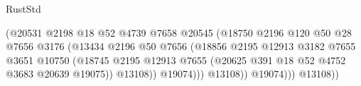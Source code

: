 \begin{lexlean}{RustStd}
\begin{coremodule}
                                                  (@20531
                                                    @2198
                                                    @18
                                                    @52
                                                    @4739
                                                    @7658
                                                    @20545
                                                    (@18750
                                                      @2196
                                                      @120
                                                      @50
                                                      @28
                                                      @7656
                                                      @3176
                                                      (@13434
                                                        @2196
                                                        @50
                                                        @7656
                                                        (@18856
                                                          @2195
                                                          @12913
                                                          @3182
                                                          @7655
                                                          @3651
                                                          @10750
                                                          (@18745
                                                            @2195
                                                            @12913
                                                            @7655
                                                            (@20625
                                                              @391
                                                              @18
                                                              @52
                                                              @4752
                                                              @3683
                                                              @20639
                                                              @19075))
                                                          @13108))
                                                      @19074)))
                                                @13108))
                                            @19074)))
                                      @13108))

\end{coremodule}
\end{lexlean}
